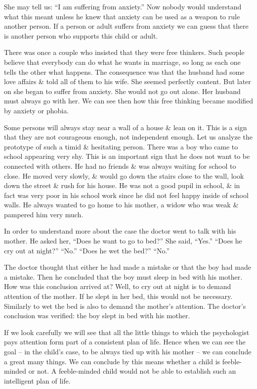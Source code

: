 \documentclass{article}
\begin{document}
She may tell us: ``I am suffering from anxiety.'' Now nobody would understand what this meant unless he knew that anxiety can be used as a weapon to rule another person. If a person or adult suffers from anxiety we can guess that there is another person who supports this child or adult.

There was once a couple who insisted that they were free thinkers. Such people believe that everybody can do what he wants in marriage, so long as each one tells the other what happens. The consequence was that the husband had some love affairs \& told all of them to his wife. She seemed perfectly content. But later on she began to suffer from anxiety. She would not go out alone. Her husband must always go with her. We can see then how this free thinking became modified by anxiety or phobia.

Some persons will always stay near a wall of a house \& lean on it. This is a sign that they are not courageous enough, not independent enough. Let us analyze the prototype of such a timid \& hesitating person. There was a boy who came to school appearing very shy. This is an important sign that he does not want to be connected with others. He had no friends \& was always waiting for school to close. He moved very slowly, \& would go down the stairs close to the wall, look down the street \& rush for his house. He was not a good pupil in school, \& in fact was very poor in his school work since he did not feel happy inside of school walls. He always wanted to go home to his mother, a widow who was weak \& pampered him very much.

In order to understand more about the case the doctor went to talk with his mother. He asked her, ``Does he want to go to bed?'' She said, ``Yes.'' ``Does he cry out at night?'' ``No.'' ``Does he wet the bed?'' ``No.''

The doctor thought that either he had made a mistake or that the boy had made a mistake. Then he concluded that the boy must sleep in bed with his mother. How was this conclusion arrived at? Well, to cry out at night is to demand attention of the mother. If he slept in her bed, this would not be necessary. Similarly to wet the bed is also to demand the mother's attention. The doctor's conclusion was verified: the boy slept in bed with his mother.

If we look carefully we will see that all the little things to which the psychologist pays attention form part of a consistent plan of life. Hence when we can see the goal -- in the child's case, to be always tied up with his mother -- we can conclude a great many things. We can conclude by this means whether a child is feeble-minded or not. A feeble-minded child would not be able to establish such an intelligent plan of life.
\end{document}
